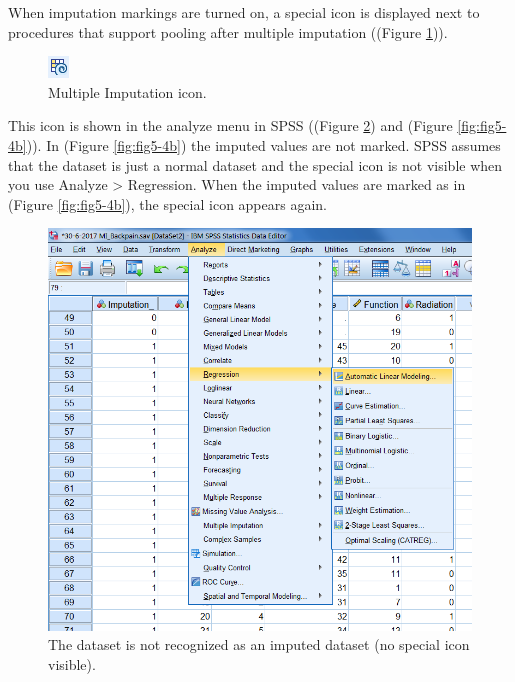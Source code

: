 \documentclass[]{book}
\theoremstyle{definition}
\theoremstyle{definition}
\theoremstyle{definition}
\theoremstyle{remark}
\begin{document}
When imputation markings are turned on, a special icon is displayed next
to procedures that support pooling after multiple imputation ((Figure
\ref{fig:fig5-3})).

\begin{figure}

{\centering \includegraphics[width=0.05\linewidth]{images/fig5.3} 

}

\caption{Multiple Imputation icon.}\label{fig:fig5-3}
\end{figure}

This icon is shown in the analyze menu in SPSS ((Figure
\ref{fig:fig5-4a}) and (Figure \ref{fig:fig5-4b})). In (Figure
\ref{fig:fig5-4b}) the imputed values are not marked. SPSS assumes that
the dataset is just a normal dataset and the special icon is not visible
when you use Analyze \textgreater{} Regression. When the imputed values
are marked as in (Figure \ref{fig:fig5-4b}), the special icon appears
again.

\begin{figure}

{\centering \includegraphics[width=0.9\linewidth]{images/fig5.4a} 

}

\caption{The dataset is not recognized as an imputed dataset (no special icon visible).}\label{fig:fig5-4a}
\end{figure}
\end{document}
